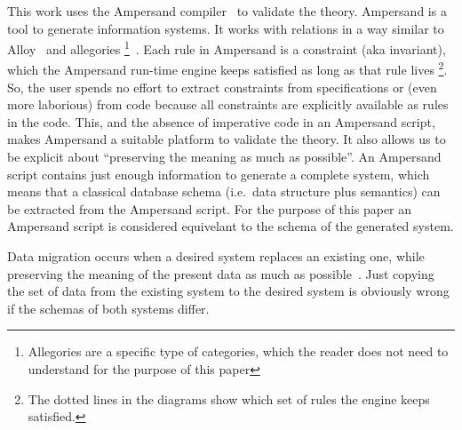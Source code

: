 \documentclass{elsarticle}
\begin{document}
   This work uses the Ampersand compiler~\cite{Joosten-JLAMP2018} to validate the theory.
   Ampersand is a tool to generate information systems.
   It works with relations in a way similar to Alloy~\cite{Alloy2006} and allegories%
\footnote{Allegories are a specific type of categories, which the reader does not need to understand for the purpose of this paper}~\cite{Zielinski2013}.
   Each rule in Ampersand is a constraint (aka invariant), which the Ampersand run-time engine keeps satisfied as long as that rule lives%
\footnote{The dotted lines in the diagrams show which set of rules the engine keeps satisfied.}.
   So, the user spends no effort to extract constraints from specifications or (even more laborious) from code
   because all constraints are explicitly available as rules in the code.
   This, and the absence of imperative code in an Ampersand script, makes Ampersand a suitable platform to validate the theory.
   It also allows us to be explicit about ``preserving the meaning as much as possible''.
   An Ampersand script contains just enough information to generate a complete system,
   which means that a classical database schema (i.e.\ data structure plus semantics) can be extracted from the Ampersand script.
   For the purpose of this paper an Ampersand script is considered equivelant to the schema of the generated system.

   Data migration occurs when a desired system replaces an existing one,
   while preserving the meaning of the present data as much as possible~\cite{Spivak2012}.
   Just copying the set of data from the existing system to the desired system is obviously wrong if the schemas of both systems differ.
\end{document}
